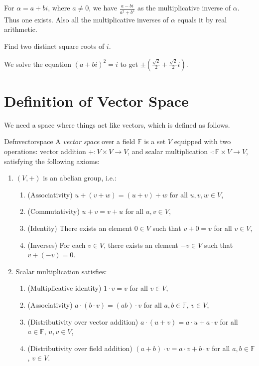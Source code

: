 For $\alpha=a+bi$, where $a\neq0$, we have $\displaystyle\frac{a-bi}{a^2+b^2}$ as the multiplicative inverse of $\alpha$. Thus one exists. Also all the multiplicative inverses of $\alpha$ equals it by real arithmetic.

\setcounter{exercise}{7}

\begin{exercise}
  Find two distinct square roots of $i$.
\end{exercise}

We solve the equation $\left(a+bi\right)^2=i$ to get $\pm\left(\displaystyle\frac{\sqrt{2}}{2}+\frac{\sqrt{2}}{2}i\right)$.

\section{Definition of Vector Space}

We need a space where things act like vectors, which is defined as follows.

\begin{reference}{Defn}{vectorspace}
  A \textit{vector space} over a field $\mathbb F$ is a set \( V \) equipped with two operations: vector addition \( + : V \times V \to V \), and scalar multiplication \( \cdot : \mathbb F \times V \to V \), satisfying the following axioms:
  \begin{enumerate}
    \item \((V, +)\) is an abelian group, i.e.:
          \begin{enumerate}
            \item (Associativity) \( u + (v + w) = (u + v) + w \) for all \( u, v, w \in V \),
            \item (Commutativity) \( u + v = v + u \) for all \( u, v \in V \),
            \item (Identity) There exists an element \( 0 \in V \) such that \( v + 0 = v \) for all \( v \in V \),
            \item (Inverses) For each \( v \in V \), there exists an element \( -v \in V \) such that \( v + (-v) = 0 \).
          \end{enumerate}
    \item Scalar multiplication satisfies:
          \begin{enumerate}
            \item (Multiplicative identity) \( 1 \cdot v = v \) for all \( v \in V \),
            \item (Associativity) \( a \cdot (b \cdot v) = (ab) \cdot v \) for all \( a, b \in \mathbb F \), \( v \in V \),
            \item (Distributivity over vector addition) \( a \cdot (u + v) = a \cdot u + a \cdot v \) for all \( a \in \mathbb F \), \( u, v \in V \),
            \item (Distributivity over field addition) \( (a + b) \cdot v = a \cdot v + b \cdot v \) for all \( a, b \in \mathbb F \), \( v \in V \).\qedhere
          \end{enumerate}
  \end{enumerate}
\end{reference}


